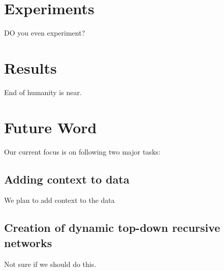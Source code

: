 \documentclass{IEEEtran}
\begin{document}
    \section{Experiments}

    DO you even experiment?

    \section{Results}

    End of humanity is near.

    \section{Future Word}
      Our current focus is on following two major tasks:
      \subsection{Adding context to data}
        We plan to add context to the data
      \subsection{Creation of dynamic top-down recursive networks}
        Not sure if we should do this. 

    
    
\end{document}
